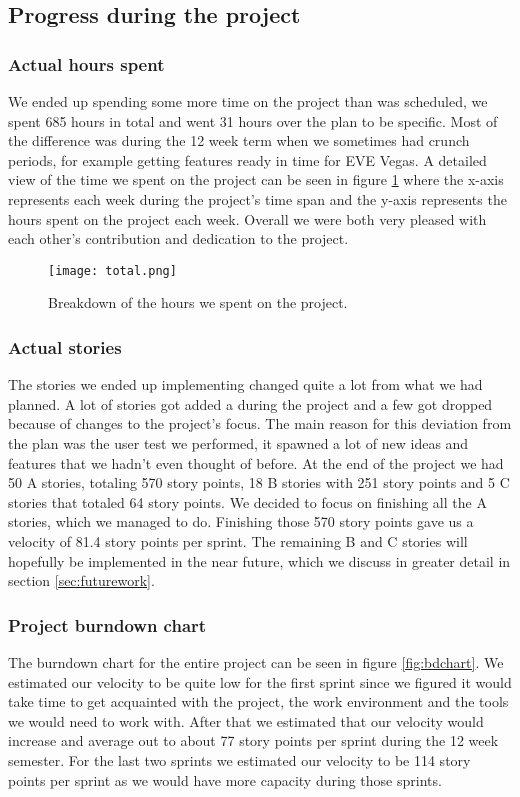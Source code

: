 \subsection{Progress during the project}

	\subsubsection{Actual hours spent}
  We ended up spending some more time on the project than was scheduled, we spent 685 hours in total and went 31 hours over the plan to be specific. Most of the difference was during the 12 week term when we sometimes had crunch periods, for example getting features ready in time for EVE Vegas. A detailed view of the time we spent on the project can be seen in figure \ref{fig:total} where the x-axis represents each week during the project's time span and the y-axis represents the hours spent on the project each week. Overall we were both very pleased with each other's contribution and dedication to the project. 

		\begin{figure}[H]
      \centering
      \graphicspath{ {./graphics/} }
      \centerline{\texttt{[image: total.png]}}
      \caption{\label{fig:total} Breakdown of the hours we spent on the project.}
    \end{figure}
	
	\subsubsection{Actual stories}
		The stories we ended up implementing changed quite a lot from what we had planned. A lot of stories got added a during the project and a few got dropped because of changes to the project's focus. The main reason for this deviation from the plan was the user test we performed, it spawned a lot of new ideas and features that we hadn't even thought of before. At the end of the project we had 50 A stories, totaling 570 story points, 18 B stories with 251 story points and 5 C stories that totaled 64 story points. We decided to focus on finishing all the A stories, which we managed to do. Finishing those 570 story points gave us a velocity of 81.4 story points per sprint. The remaining B and C stories will hopefully be implemented in the near future, which we discuss in greater detail in section \ref{sec:futurework}.

	\subsubsection{Project burndown chart}
    The burndown chart for the entire project can be seen in figure \ref{fig:bdchart}. We estimated our velocity to be quite low for the first sprint since we figured it would take time to get acquainted with the project, the work environment and the tools we would need to work with. After that we estimated that our velocity would increase and average out to about 77 story points per sprint during the 12 week semester. For the last two sprints we estimated our velocity to be 114 story points per sprint as we would have more capacity during those sprints. 

